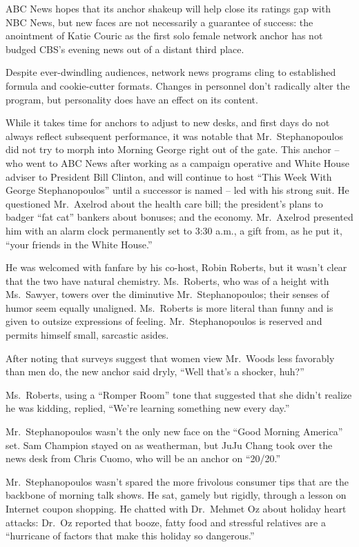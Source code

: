 ﻿\documentclass[12pt]{article}
\begin{document}
ABC News hopes that its anchor shakeup will help close its ratings gap with NBC News, but new faces
are not necessarily a guarantee of success: the anointment of Katie Couric as the first solo female
network anchor has not budged CBS's evening news out of a distant third place.

Despite ever-dwindling audiences, network news programs cling to established formula and
cookie-cutter formats. Changes in personnel don't radically alter the program, but personality does
have an effect on its content.

While it takes time for anchors to adjust to new desks, and first days do not always reflect
subsequent performance, it was notable that Mr.~Stephanopoulos did not try to morph into Morning
George right out of the gate. This anchor -- who went to ABC News after working as a campaign
operative and White House adviser to President Bill Clinton, and will continue to host ``This Week
With George Stephanopoulos'' until a successor is named -- led with his strong suit. He questioned
Mr.~Axelrod about the health care bill; the president's plans to badger ``fat cat'' bankers about
bonuses; and the economy. Mr.~Axelrod presented him with an alarm clock permanently set to 3:30
a.m., a gift from, as he put it, ``your friends in the White House.''

He was welcomed with fanfare by his co-host, Robin Roberts, but it wasn't clear that the two have
natural chemistry. Ms.~Roberts, who was of a height with Ms.~Sawyer, towers over the diminutive
Mr.~Stephanopoulos; their senses of humor seem equally unaligned. Ms.~Roberts is more literal than
funny and is given to outsize expressions of feeling. Mr.~Stephanopoulos is reserved and permits
himself small, sarcastic asides.

After noting that surveys suggest that women view Mr.~Woods less favorably than men do, the new
anchor said dryly, ``Well that's a shocker, huh?''

Ms.~Roberts, using a ``Romper Room'' tone that suggested that she didn't realize he was kidding,
replied, ``We're learning something new every day.''

Mr.~Stephanopoulos wasn't the only new face on the ``Good Morning America'' set. Sam Champion stayed
on as weatherman, but JuJu Chang took over the news desk from Chris Cuomo, who will be an anchor on
``20/20.''

Mr.~Stephanopoulos wasn't spared the more frivolous consumer tips that are the backbone of morning
talk shows. He sat, gamely but rigidly, through a lesson on Internet coupon shopping. He chatted
with Dr.~Mehmet Oz about holiday heart attacks: Dr.~Oz reported that booze, fatty food and stressful
relatives are a ``hurricane of factors that make this holiday so dangerous.''
\end{document}
